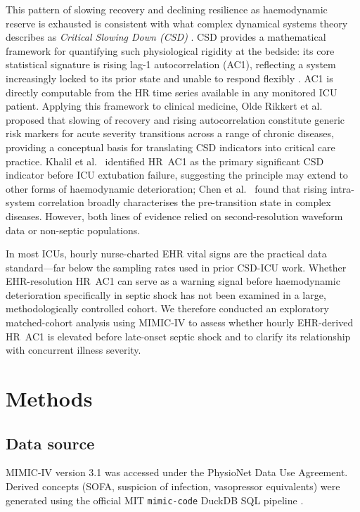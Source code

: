 \documentclass[referee,lineno,pdflatex]{sn-article-template/sn-jnl}
\begin{document}
This pattern of slowing recovery and declining resilience as haemodynamic reserve is
exhausted is consistent with what complex dynamical systems theory describes as
\emph{Critical Slowing Down (CSD)} \cite{scheffer2009,dakos2012}.
CSD provides a mathematical framework for quantifying such physiological rigidity at the
bedside: its core statistical signature is rising lag-1 autocorrelation (AC1), reflecting
a system increasingly locked to its prior state and unable to respond flexibly
\cite{scheffer2009}.
AC1 is directly computable from the HR time series available in any monitored ICU patient.
Applying this framework to clinical medicine, Olde Rikkert et al.~\cite{olderikkert2016}
proposed that slowing of recovery and rising autocorrelation constitute generic risk
markers for acute severity transitions across a range of chronic diseases, providing a
conceptual basis for translating CSD indicators into critical care practice.
Khalil et al.~\cite{khalil2025} identified HR~AC1 as the primary significant CSD
indicator before ICU extubation failure, suggesting the principle may extend to other
forms of haemodynamic deterioration; Chen et al.~\cite{chen2012} found that rising
intra-system correlation broadly characterises the pre-transition state in complex
diseases.
However, both lines of evidence relied on second-resolution waveform data or non-septic
populations.

In most ICUs, hourly nurse-charted EHR vital signs are the practical data standard---far
below the sampling rates used in prior CSD-ICU work.
Whether EHR-resolution HR~AC1 can serve as a warning signal before haemodynamic
deterioration specifically in septic shock has not been examined in a large,
methodologically controlled cohort.
We therefore conducted an exploratory matched-cohort analysis using MIMIC-IV
\cite{johnson2023} to assess whether hourly EHR-derived HR~AC1 is elevated before
late-onset septic shock and to clarify its relationship with concurrent illness severity.

\section{Methods}
\label{sec:methods}

\subsection{Data source}
MIMIC-IV version 3.1 was accessed under the PhysioNet Data Use Agreement.
Derived concepts (SOFA, suspicion of infection, vasopressor equivalents)
were generated using the official MIT \texttt{mimic-code} DuckDB SQL pipeline
\cite{johnson2023}.
\end{document}
